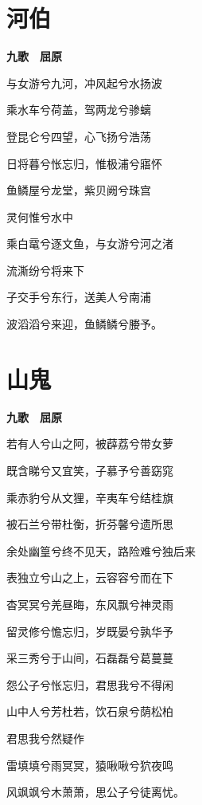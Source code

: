 \documentclass[12pt,a4paper]{ctexbook}
\begin{document}
\section{河伯}
\textbf{九歌　屈原}\par\vspace{0.5em}
与女游兮九河，冲风起兮水扬波\par
乘水车兮荷盖，驾两龙兮骖螭\par
登昆仑兮四望，心飞扬兮浩荡\par
日将暮兮怅忘归，惟极浦兮寤怀\par
鱼鳞屋兮龙堂，紫贝阙兮珠宫\par
灵何惟兮水中\par
乘白鼋兮逐文鱼，与女游兮河之渚\par
流澌纷兮将来下\par
子交手兮东行，送美人兮南浦\par
波滔滔兮来迎，鱼鳞鳞兮媵予。\par

\section{山鬼}
\textbf{九歌　屈原}\par\vspace{0.5em}
若有人兮山之阿，被薜荔兮带女萝\par
既含睇兮又宜笑，子慕予兮善窈窕\par
乘赤豹兮从文狸，辛夷车兮结桂旗\par
被石兰兮带杜衡，折芬馨兮遗所思\par
余处幽篁兮终不见天，路险难兮独后来\par
表独立兮山之上，云容容兮而在下\par
杳冥冥兮羌昼晦，东风飘兮神灵雨\par
留灵修兮憺忘归，岁既晏兮孰华予\par
采三秀兮于山间，石磊磊兮葛蔓蔓\par
怨公子兮怅忘归，君思我兮不得闲\par
山中人兮芳杜若，饮石泉兮荫松柏\par
君思我兮然疑作\par
雷填填兮雨冥冥，猿啾啾兮狖夜鸣\par
风飒飒兮木萧萧，思公子兮徒离忧。\par
\end{document}
